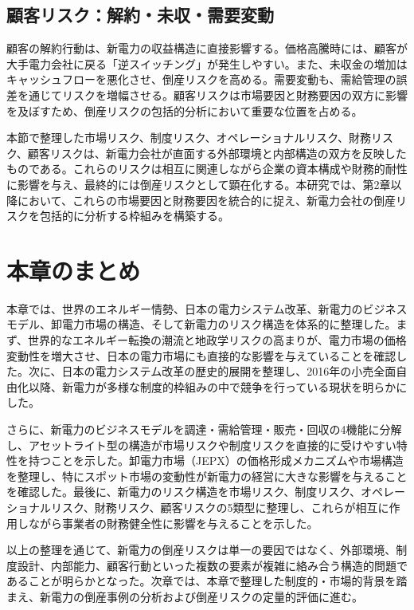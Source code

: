 \subsection{顧客リスク：解約・未収・需要変動}

顧客の解約行動は、新電力の収益構造に直接影響する。価格高騰時には、顧客が大手電力会社に戻る「逆スイッチング」が発生しやすい。また、未収金の増加はキャッシュフローを悪化させ、倒産リスクを高める。需要変動も、需給管理の誤差を通じてリスクを増幅させる。顧客リスクは市場要因と財務要因の双方に影響を及ぼすため、倒産リスクの包括的分析において重要な位置を占める。

本節で整理した市場リスク、制度リスク、オペレーショナルリスク、財務リスク、顧客リスクは、新電力会社が直面する外部環境と内部構造の双方を反映したものである。これらのリスクは相互に関連しながら企業の資本構成や財務的耐性に影響を与え、最終的には倒産リスクとして顕在化する。本研究では、第2章以降において、これらの市場要因と財務要因を統合的に捉え、新電力会社の倒産リスクを包括的に分析する枠組みを構築する。



\section{本章のまとめ}

本章では、世界のエネルギー情勢、日本の電力システム改革、新電力のビジネスモデル、卸電力市場の構造、そして新電力のリスク構造を体系的に整理した。まず、世界的なエネルギー転換の潮流と地政学リスクの高まりが、電力市場の価格変動性を増大させ、日本の電力市場にも直接的な影響を与えていることを確認した。次に、日本の電力システム改革の歴史的展開を整理し、2016年の小売全面自由化以降、新電力が多様な制度的枠組みの中で競争を行っている現状を明らかにした。

さらに、新電力のビジネスモデルを調達・需給管理・販売・回収の4機能に分解し、アセットライト型の構造が市場リスクや制度リスクを直接的に受けやすい特性を持つことを示した。卸電力市場（JEPX）の価格形成メカニズムや市場構造を整理し、特にスポット市場の変動性が新電力の経営に大きな影響を与えることを確認した。最後に、新電力のリスク構造を市場リスク、制度リスク、オペレーショナルリスク、財務リスク、顧客リスクの5類型に整理し、これらが相互に作用しながら事業者の財務健全性に影響を与えることを示した。

以上の整理を通じて、新電力の倒産リスクは単一の要因ではなく、外部環境、制度設計、内部能力、顧客行動といった複数の要素が複雑に絡み合う構造的問題であることが明らかとなった。次章では、本章で整理した制度的・市場的背景を踏まえ、新電力の倒産事例の分析および倒産リスクの定量的評価に進む。
